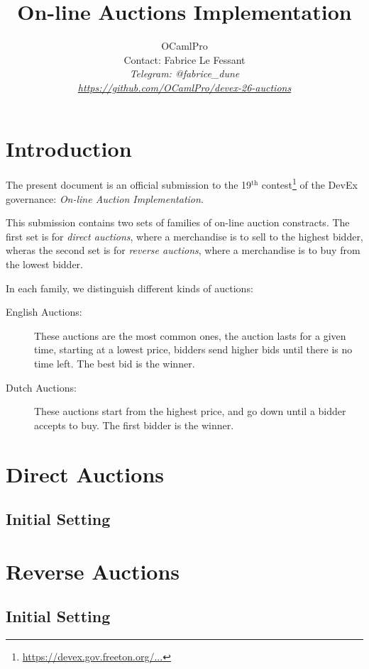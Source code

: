 \documentclass[10pt,a4paper]{article}
\author{OCamlPro\\Contact: Fabrice Le Fessant\\\em{Telegram: @fabrice\_dune} \\ \small{\url{https://github.com/OCamlPro/devex-26-auctions}}}
\title{On-line Auctions Implementation}
\date{}
\begin{document}
\maketitle

\section{Introduction}
\label{sec:intro}

The present document is an official submission to the 19$^{\text{th}}$
contest\footnote{\url{https://devex.gov.freeton.org/...}}
of the DevEx governance: {\em On-line Auction Implementation}.

This submission contains two sets of families of on-line auction
constracts. The first set is for {\em direct auctions}, where a
merchandise is to sell to the highest bidder, wheras the second set is
for {\em reverse auctions}, where a merchandise is to buy from the
lowest bidder.

In each family, we distinguish different kinds of auctions:
\begin{description}
  \item[English Auctions:] These auctions are the most common ones,
    the auction lasts for a given time, starting at a lowest price,
    bidders send higher bids until there is no time left. The best bid
    is the winner.
  \item[Dutch Auctions:] These auctions start from the highest price,
    and go down until a bidder accepts to buy. The first bidder is the
    winner. 
  \end{description}


\section{Direct Auctions}

\subsection{Initial Setting}

\section{Reverse Auctions}

\subsection{Initial Setting}
\end{document}
